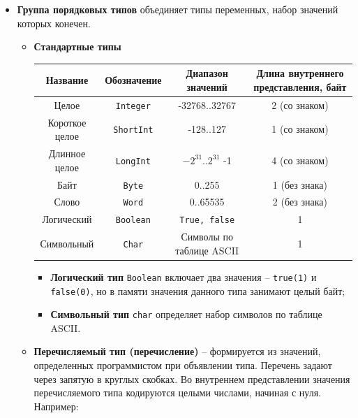 \begin{itemize}
\item {\bf {Группа порядковых типов}} объединяет типы переменных, набор значений которых конечен.

    \begin{itemize}    
    \item {\bf{Стандартные типы}}

        {\small
        \begin{center}
        \begin{tabular}{ | c | c | c | c | }
        \hline
        Название & Обозначение & Диапазон значений & Длина внутреннего представления, байт\\
        \hline
        Целое & \texttt{Integer} & -32768..32767 & 2 (со знаком) \\
        \hline
        Короткое целое & \texttt{ShortInt} & -128..127 & 1 (со знаком) \\
        \hline
        Длинное целое & \texttt{LongInt} & $-2^{31}$..$2^{31}$ -1 & 4 (со знаком) \\
        \hline
        Байт & \texttt{Byte} & 0..255 & 1 (без знака) \\
        \hline
        Слово & \texttt{Word} & 0..65535 & 2 (без знака) \\
        \hline
        Логический & \texttt{Boolean} & \texttt{True, false} & 1 \\ 
        \hline
        Символьный & \texttt{Char} & Символы по таблице ASCII & 1\\
        \hline
        \end{tabular}
        \end{center}
        }
        
        \begin{itemize}
            \item {\bf{Логический тип}} \texttt{Boolean} включает два значения – \texttt{true(1)} и \texttt{false(0)}, но в памяти значения данного типа занимают целый байт;

            \item {\bf{Символьный тип}} \texttt{char} определяет набор символов по таблице ASCII. 
        \end{itemize}

    \item {\bf{Перечисляемый тип (перечисление)}} 
        – формируется из значений, определенных программистом при объявлении типа. Перечень задают через запятую в круглых скобках. Во внутреннем представлении значения перечисляемого типа кодируются целыми числами, начиная с нуля. Например:



\end{itemize}
\end{itemize}
